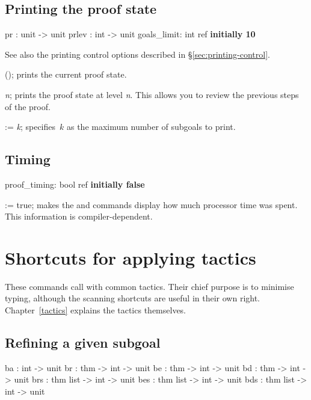 \subsection{Printing the proof state}\label{sec:goals-printing}
\begin{ttbox} 
pr    : unit -> unit
prlev : int -> unit
goals_limit: int ref \hfill{\bf initially 10}
\end{ttbox}
See also the printing control options described in
\S\ref{sec:printing-control}. 
\begin{ttdescription}
\item[\ttindexbold{pr}();] 
prints the current proof state.

\item[\ttindexbold{prlev} {\it n};] 
prints the proof state at level {\it n}.  This allows you to review the
previous steps of the proof.

\item[\ttindexbold{goals_limit} := {\it k};] 
specifies~$k$ as the maximum number of subgoals to print.
\end{ttdescription}


\subsection{Timing}
\begin{ttbox} 
proof_timing: bool ref \hfill{\bf initially false}
\end{ttbox}

\begin{ttdescription}
\item[\ttindexbold{proof_timing} := true;] 
makes the  and  commands display how much
processor time was spent.  This information is compiler-dependent.
\end{ttdescription}


\section{Shortcuts for applying tactics}
These commands call  with common tactics.  Their chief purpose
is to minimise typing, although the scanning shortcuts are useful in their
own right.  Chapter~\ref{tactics} explains the tactics themselves.

\subsection{Refining a given subgoal}
\begin{ttbox} 
ba  :             int -> unit
br  : thm      -> int -> unit
be  : thm      -> int -> unit
bd  : thm      -> int -> unit
brs : thm list -> int -> unit
bes : thm list -> int -> unit
bds : thm list -> int -> unit
\end{ttbox}

